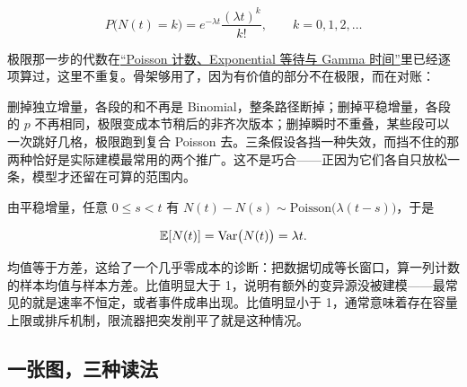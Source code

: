 \[
P\bigl(N(t)=k\bigr)=e^{-\lambda t}\frac{(\lambda t)^k}{k!},\qquad k=0,1,2,\ldots
\]

极限那一步的代数在\hyperref[sec:05-Probability/06-Common-Distributions/03]{``Poisson 计数、Exponential 等待与 Gamma 时间''}里已经逐项算过，这里不重复。骨架够用了，因为有价值的部分不在极限，而在对账：

删掉独立增量，各段的和不再是 Binomial，整条路径断掉；删掉平稳增量，各段的 \(p\) 不再相同，极限变成本节稍后的非齐次版本；删掉瞬时不重叠，某些段可以一次跳好几格，极限跑到复合 Poisson 去。三条假设各挡一种失效，而挡不住的那两种恰好是实际建模最常用的两个推广。这不是巧合——正因为它们各自只放松一条，模型才还留在可算的范围内。

由平稳增量，任意 \(0\le s<t\) 有 \(N(t)-N(s)\sim\mathrm{Poisson}\bigl(\lambda(t-s)\bigr)\)，于是

\[
\mathbb{E}[N(t)]=\operatorname{Var}\bigl(N(t)\bigr)=\lambda t.
\]

均值等于方差，这给了一个几乎零成本的诊断：把数据切成等长窗口，算一列计数的样本均值与样本方差。比值明显大于 1，说明有额外的变异源没被建模——最常见的就是速率不恒定，或者事件成串出现。比值明显小于 1，通常意味着存在容量上限或排斥机制，限流器把突发削平了就是这种情况。

\subsection{一张图，三种读法}

